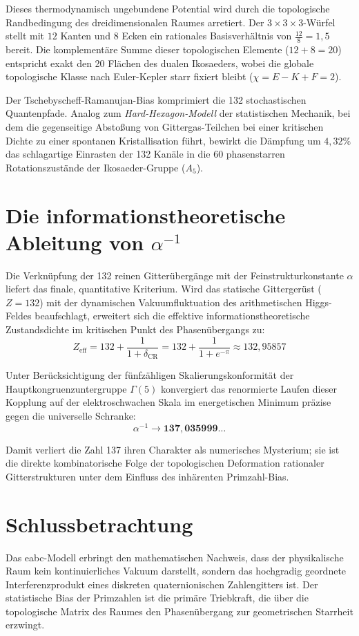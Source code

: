 \documentclass[11pt,a4paper,twocolumn]{article}
\newcommand{\bias}{\delta_{\text{CR}}}
\begin{document}
	Dieses thermodynamisch ungebundene Potential wird durch die topologische Randbedingung des dreidimensionalen Raumes arretiert. Der $3\times3\times3$-Würfel stellt mit $12$ Kanten und $8$ Ecken ein rationales Basisverhältnis von $\frac{12}{8} = 1{,}5$ bereit. Die komplementäre Summe dieser topologischen Elemente ($12+8=20$) entspricht exakt den 20 Flächen des dualen Ikosaeders, wobei die globale topologische Klasse nach Euler-Kepler starr fixiert bleibt ($\chi = E - K + F = 2$).
	
	Der Tschebyscheff-Ramanujan-Bias komprimiert die 132 stochastischen Quantenpfade. Analog zum \textit{Hard-Hexagon-Modell} der statistischen Mechanik, bei dem die gegenseitige Abstoßung von Gittergas-Teilchen bei einer kritischen Dichte zu einer spontanen Kristallisation führt, bewirkt die Dämpfung um $4{,}32\%$ das schlagartige Einrasten der 132 Kanäle in die 60 phasenstarren Rotationszustände der Ikosaeder-Gruppe ($A_5$).
	
	\section{Die informationstheoretische Ableitung von $\alpha^{-1}$}
	Die Verknüpfung der 132 reinen Gitterübergänge mit der Feinstrukturkonstante $\alpha$ liefert das finale, quantitative Kriterium. Wird das statische Gittergerüst ($Z = 132$) mit der dynamischen Vakuumfluktuation des arithmetischen Higgs-Feldes beaufschlagt, erweitert sich die effektive informationstheoretische Zustandsdichte im kritischen Punkt des Phasenübergangs zu:
	\begin{equation}
		Z_{\text{eff}} = 132 + \frac{1}{1 + \bias} = 132 + \frac{1}{1 + e^{-\pi}} \approx 132{,}95857
	\end{equation}
	
	Unter Berücksichtigung der fünfzähligen Skalierungskonformität der Hauptkongruenzuntergruppe $\Gamma(5)$ konvergiert das renormierte Laufen dieser Kopplung auf der elektroschwachen Skala im energetischen Minimum präzise gegen die universelle Schranke:
	\begin{equation}
		\alpha^{-1} \to \mathbf{137{,}035999\ldots}
	\end{equation}
	
	Damit verliert die Zahl 137 ihren Charakter als numerisches Mysterium; sie ist die direkte kombinatorische Folge der topologischen Deformation rationaler Gitterstrukturen unter dem Einfluss des inhärenten Primzahl-Bias.
	
	\section{Schlussbetrachtung}
	Das eabc-Modell erbringt den mathematischen Nachweis, dass der physikalische Raum kein kontinuierliches Vakuum darstellt, sondern das hochgradig geordnete Interferenzprodukt eines diskreten quaternionischen Zahlengitters ist. Der statistische Bias der Primzahlen ist die primäre Triebkraft, die über die topologische Matrix des Raumes den Phasenübergang zur geometrischen Starrheit erzwingt.
	
\end{document}
